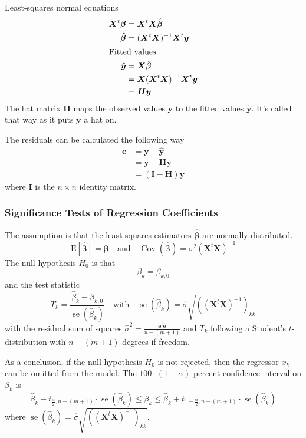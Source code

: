 \documentclass[11pt]{article}
\theoremstyle{definition}
\newcommand*\ev[1]{\mathrel{\text{E}\left[#1\right]}}
\newcommand*\Cov[1]{\mathop{\text{Cov}}\left(#1\right)}
\newcommand*\se[1]{\mathop{\text{se}}\left(#1\right)}
\begin{document}
Least-squares normal equations
\begin{align*}
	\bm{X}^t\bm{\beta} &= \bm{X}^t\bm{X}\hat{\bm{\beta}}\\
	\hat{\bm{\beta}} &= (\bm{X}^t\bm{X})^{-1}\bm{X}^t\bm{y}\\
	\intertext{Fitted values}
	\hat{\bm{y}} &= \bm{X}\hat{\bm{\beta}}\\
	&= \bm{X}(\bm{X}^t\bm{X})^{-1}\bm{X}^t\bm{y}\\
	&= \bm{H}\bm{y}
\end{align*}
The hat matrix $\bm{H}$ maps the observed values $\bm{y}$ to the fitted values $\hat{\bm{y}}$. It's called that way as it puts $\bm{y}$ a hat on.

The residuals can be calculated the following way
\begin{align*}
	\bm{e} &= \bm{y} - \hat{\bm{y}}\\
	&= \bm{y} - \bm{H}\bm{y}\\
	&= (\bm{I} - \bm{H}) \bm{y}
\end{align*}
where $\bm{I}$ is the $n\times n$ identity matrix.

\subsubsection{Significance Tests of Regression Coefficients}
The assumption is that the least-squares estimators $\hat{\bm{\beta}}$ are normally distributed.
\begin{equation*}
	\ev{\hat{\bm{\beta}}} = \bm{\beta}\quad\text{and}\quad\Cov{\hat{\bm{\beta}}} = \sigma^2(\bm{X}^t\bm{X})^{-1}
\end{equation*}
The null hypothesis $H_0$ is that
\begin{equation*}
	\beta_k = \beta_{k,0}
\end{equation*}
and the test statistic
\begin{equation*}
	T_k = \frac{\hat{\beta}_k - \beta_{k,0}}{\se{\hat{\beta}_k}}\quad\text{with}\quad\se{\hat{\beta}_k} = \hat{\sigma}\sqrt{\left((\bm{X}^t\bm{X})^{-1}\right)_{kk}}
\end{equation*}
with the residual sum of squares $\hat{\sigma}^2 = \frac{\bm{e}^t\bm{e}}{n-(m+1)}$ and $T_k$ following a Student's $t$-distribution with $n-(m+1)$ degrees if freedom.

As a conclusion, if the null hypothesis $H_0$ is not rejected, then the regressor $x_k$ can be omitted from the model. The $100\cdot(1-\alpha)$ percent confidence interval on $\beta_k$ is
\begin{equation*}
	\hat{\beta}_k - t_{\frac{\alpha}{2},n-(m+1)}\cdot\se{\hat{\beta}_k} \leq \beta_k \leq \hat{\beta}_k + t_{1 - \frac{\alpha}{2},n-(m+1)}\cdot\se{\hat{\beta}_k}
\end{equation*}
where $\se{\hat{\beta}_k} = \hat{\sigma}\sqrt{\left((\bm{X}^t\bm{X})^{-1}\right)_{kk}}$.
\end{document}
